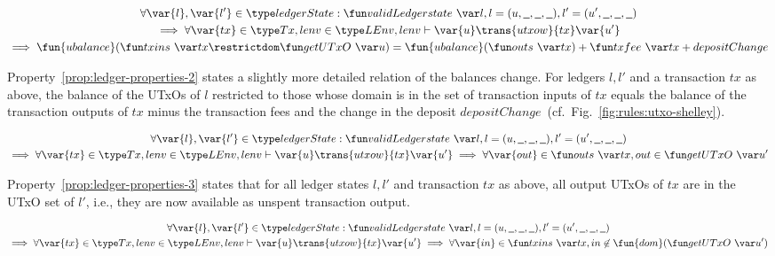 \begin{property}
  \begin{multline*}
    \forall \var{l}, \var{l'} \in \ledgerState: \applyFun{validLedgerstate}{l},
    l=(u,\wcard,\wcard,\wcard), l' = (u',\wcard,\wcard,\wcard)\\
    \implies \forall \var{tx} \in \Tx, lenv \in\LEnv, lenv \vdash \var{u}
    \trans{utxow}{tx} \var{u'} \\
    \implies \fun{ubalance}(\applyFun{txins}{tx} \restrictdom
    \applyFun{getUTxO}{u}) = \fun{ubalance}(\applyFun{outs}{tx}) +
    \applyFun{txfee}{tx} + depositChange
  \end{multline*}
  \label{prop:ledger-properties-2}
\end{property}

Property~\ref{prop:ledger-properties-2} states a slightly more detailed relation
of the balances change. For ledgers $l, l'$ and a transaction $tx$ as above, the
balance of the UTxOs of $l$ restricted to those whose domain is in the set of
transaction inputs of $tx$ equals the balance of the transaction outputs of $tx$
minus the transaction fees and the change in the deposit
$depositChange$~(cf.~Fig.~\ref{fig:rules:utxo-shelley}).

\begin{property}
  \begin{multline*}
    \forall \var{l}, \var{l'} \in \ledgerState: \applyFun{validLedgerstate}{l},
    l=(u,\wcard,\wcard,\wcard), l' = (u',\wcard,\wcard,\wcard)\\
    \implies \forall \var{tx} \in \Tx, lenv \in\LEnv, lenv \vdash \var{u}
    \trans{utxow}{tx} \var{u'} \implies \forall \var{out} \in
    \applyFun{outs}{tx}, out \in \applyFun{getUTxO}{u'}
  \end{multline*}
  \label{prop:ledger-properties-3}
\end{property}

Property~\ref{prop:ledger-properties-3} states that for all ledger states
$l, l'$ and transaction $tx$ as above, all output UTxOs of $tx$ are in the UTxO
set of $l'$, i.e., they are now available as unspent transaction output.

\begin{property}
  \begin{multline*}
    \forall \var{l}, \var{l'} \in \ledgerState: \applyFun{validLedgerstate}{l},
    l=(u,\wcard,\wcard,\wcard), l' = (u',\wcard,\wcard,\wcard)\\
    \implies \forall \var{tx} \in \Tx, lenv \in\LEnv, lenv \vdash \var{u}
    \trans{utxow}{tx} \var{u'} \implies \forall \var{in} \in
    \applyFun{txins}{tx}, in \not\in \fun{dom}(\applyFun{getUTxO}{u'})
  \end{multline*}
  \label{prop:ledger-properties-4}
\end{property}


